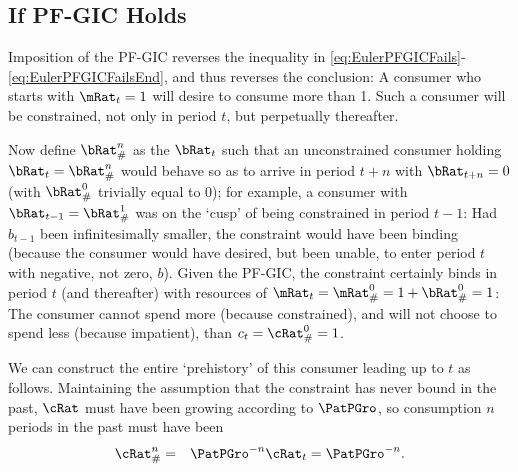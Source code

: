 \documentclass[../BufferStockTheory.tex]{subfiles}
\begin{document}
\subsection{If PF-GIC Holds}

Imposition of the PF-GIC reverses the inequality in
\eqref{eq:EulerPFGICFails}-\eqref{eq:EulerPFGICFailsEnd}, and thus
reverses the conclusion: A consumer who starts with $\mRat_{t}=1$ will
desire to consume more than 1.  Such a consumer will be constrained,
not only in period $t$, but perpetually thereafter.

Now define $\bRat_{\#}^{n}$ as the $\bRat_{t}$ such that
an unconstrained consumer holding $\bRat_{t}=\bRat_{\#}^{n}$ would behave so as to arrive in period $t+n$ with $\bRat_{t+n}=0$ (with $\bRat_{\#}^{0}$ trivially equal to 0); for example, a consumer with $\bRat_{t-1}=\bRat_{\#}^{1}$ was on the `cusp' of being constrained in period
$t-1$: Had $b_{t-1}$ been infinitesimally smaller, the constraint
would have been binding (because the consumer would have desired, but
been unable, to enter period $t$ with negative, not zero, $b$).  Given
the PF-GIC, the constraint certainly binds in period $t$ (and
thereafter) with resources of
$\mRat_{t}=\mRat_{\#}^{0}=1+\bRat_{\#}^{0}=1$: The consumer cannot
spend more (because constrained), and will not choose to spend less
(because impatient), than $c_{t}=\cRat_{\#}^{0}=1$.

We can construct the entire `prehistory' of this consumer leading up to $t$ as follows.
Maintaining the assumption that the constraint has never bound in the past,
$\cRat$ must have been growing according to $\PatPGro$, so consumption $n$ periods in the past must have been
\begin{eqnarray}
  \cRat_{\#}^{n} & = & \PatPGro^{-n} \cRat_{t} = \PatPGro^{-n}. \label{eq:cPreHist}
\end{eqnarray}
\end{document}
